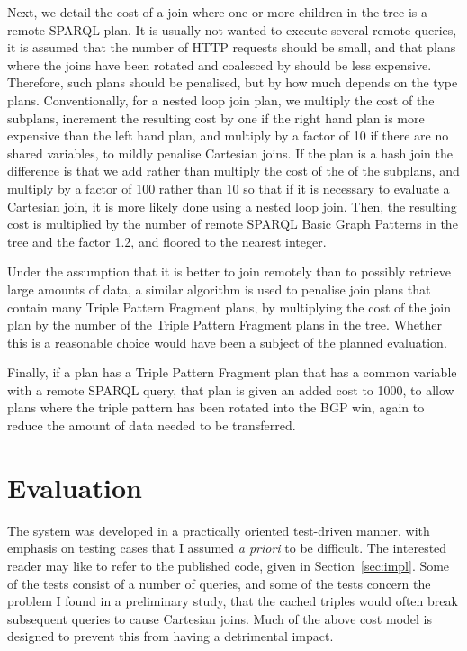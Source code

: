 Next, we detail the cost of a join where one or more children in the
tree is a remote SPARQL plan. It is usually not wanted to execute
several remote queries, it is assumed that the number of HTTP requests
should be small, and that plans where the joins have been rotated and
coalesced by  should be
less expensive. Therefore, such plans should be penalised, but by how
much depends on the type plans. Conventionally, for a nested loop join
plan, we multiply the cost of the subplans, increment the resulting
cost by one if the right hand plan is more expensive than the left
hand plan, and multiply by a factor of 10 if there are no shared
variables, to mildly penalise Cartesian joins. If the plan is a hash
join the difference is that we add rather than multiply the cost of
the of the subplans, and multiply by a factor of 100 rather than 10 so
that if it is necessary to evaluate a Cartesian join, it is more
likely done using a nested loop join. Then, the resulting cost is
multiplied by the number of remote SPARQL Basic Graph Patterns in the
tree and the factor 1.2, and floored to the nearest integer.

Under the assumption that it is better to join remotely than to
possibly retrieve large amounts of data, a similar algorithm is used
to penalise join plans that contain many Triple Pattern Fragment
plans, by multiplying the cost of the join plan by the number of the
Triple Pattern Fragment plans in the tree. Whether this is a
reasonable choice would have been a subject of the planned evaluation.

Finally, if a plan has a Triple Pattern Fragment plan that has a
common variable with a remote SPARQL query, that plan is given an
added cost to 1000, to allow plans where the triple pattern has been
rotated into the BGP win, again to reduce the amount of data needed to
be transferred.

\section{Evaluation}

The system was developed in a practically oriented test-driven manner,
with emphasis on testing cases that I assumed \textit{a priori} to be
difficult. The interested reader may like to refer to the published code,
given in Section~\ref{sec:impl}. Some of the tests consist of a number
of queries, and some of the tests concern the problem I found in a
preliminary study, that the cached triples would often break
subsequent queries to cause Cartesian joins. Much of the above cost
model is designed to prevent this from having a detrimental impact.


